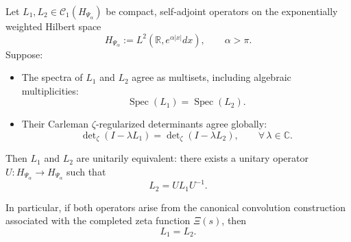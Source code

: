 \begin{proposition}
\label{prop:inverse_spectral_rigidity}

Let \( L_1, L_2 \in \mathcal{C}_1(H_{\Psi_\alpha}) \) be compact, self-adjoint operators on the exponentially weighted Hilbert space
\[
H_{\Psi_\alpha} := L^2(\mathbb{R}, e^{\alpha |x|} dx), \qquad \alpha > \pi.
\]
Suppose:
\begin{itemize}
  \item The spectra of \( L_1 \) and \( L_2 \) agree as multisets, including algebraic multiplicities:
  \[
  \operatorname{Spec}(L_1) = \operatorname{Spec}(L_2).
  \]

  \item Their Carleman \(\zeta\)-regularized determinants agree globally:
  \[
  \det\nolimits_\zeta(I - \lambda L_1) = \det\nolimits_\zeta(I - \lambda L_2), \qquad \forall\, \lambda \in \mathbb{C}.
  \]
\end{itemize}

Then \( L_1 \) and \( L_2 \) are unitarily equivalent: there exists a unitary operator \( U \colon H_{\Psi_\alpha} \to H_{\Psi_\alpha} \) such that
\[
L_2 = U L_1 U^{-1}.
\]

\medskip

\noindent
In particular, if both operators arise from the canonical convolution construction associated with the completed zeta function \( \Xi(s) \), then
\[
L_1 = L_2.
\]
\end{proposition}
